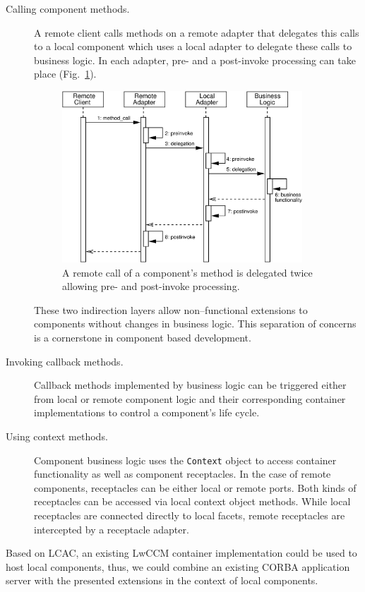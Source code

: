 \begin{description}
\item [Calling component methods.]
A remote client calls methods on a remote adapter that delegates this
calls to a local component which uses a local adapter to delegate these calls
to business logic.
In each adapter, pre- and a post-invoke processing can take place 
(Fig.~\ref{RemoteComponentCall}).
\begin{figure}[htbp]
    \begin{center}
    \includegraphics [width=9cm,angle=0] 
		     {ComponentModel/figures/RemoteComponentCall}
    \caption{A remote call of a component's method is delegated twice
    allowing pre- and post-invoke processing.}
    \label{RemoteComponentCall}            
    \end{center}
\end{figure}

These two indirection layers allow non--functional extensions to 
components without changes in business logic. 
This separation of concerns is a cornerstone in component
based development.

\item [Invoking callback methods.]
Callback methods implemented by business logic can be
triggered either from local or remote component logic and their corresponding
container implementations to control a component's life cycle.

\item [Using context methods.]
Component business logic uses the {\tt Context} object to access container
functionality as well as component receptacles.
In the case of remote components, receptacles can be either local or remote
ports. Both kinds of receptacles can be accessed via local context
object methods. While local receptacles are connected directly to local facets,
remote receptacles are intercepted by a receptacle adapter.
\end{description}

\noindent
Based on LCAC, an existing LwCCM container implementation could be used to host 
local components, thus, we could combine an existing CORBA application server 
with the presented extensions in the context of local components. 

